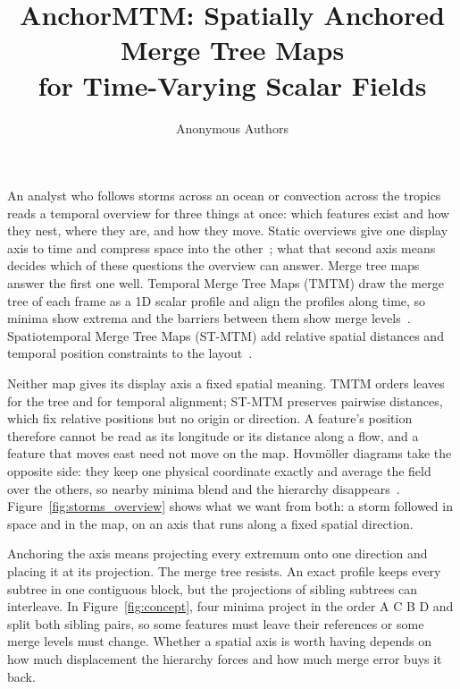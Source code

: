 \documentclass[review]{vgtc}
\title{AnchorMTM: Spatially Anchored Merge Tree Maps\\for Time-Varying Scalar Fields}
\author{Anonymous Authors}
\begin{document}
\maketitle
\raggedbottom
\setlength{\emergencystretch}{1.5em}
An analyst who follows storms across an ocean or convection across the tropics reads a temporal overview for three things at once: which features exist and how they nest, where they are, and how they move. Static overviews give one display axis to time and compress space into the other~\cite{Tversky:2002:Animation,Robertson:2008:Animation,Bach:2017:STC}; what that second axis means decides which of these questions the overview can answer. Merge tree maps answer the first one well. Temporal Merge Tree Maps (TMTM) draw the merge tree of each frame as a 1D scalar profile and align the profiles along time, so minima show extrema and the barriers between them show merge levels~\cite{Koepp:2023:TMTM}. Spatiotemporal Merge Tree Maps (ST-MTM) add relative spatial distances and temporal position constraints to the layout~\cite{STMTM:2026}.

Neither map gives its display axis a fixed spatial meaning. TMTM orders leaves for the tree and for temporal alignment; ST-MTM preserves pairwise distances, which fix relative positions but no origin or direction. A feature's position therefore cannot be read as its longitude or its distance along a flow, and a feature that moves east need not move on the map. Hovm\"oller diagrams take the opposite side: they keep one physical coordinate exactly and average the field over the others, so nearby minima blend and the hierarchy disappears~\cite{Hovmoller:1949}. Figure~\ref{fig:storms_overview} shows what we want from both: a storm followed in space and in the map, on an axis that runs along a fixed spatial direction.

Anchoring the axis means projecting every extremum onto one direction and placing it at its projection. The merge tree resists. An exact profile keeps every subtree in one contiguous block, but the projections of sibling subtrees can interleave. In Figure~\ref{fig:concept}, four minima project in the order A C B D and split both sibling pairs, so some features must leave their references or some merge levels must change. Whether a spatial axis is worth having depends on how much displacement the hierarchy forces and how much merge error buys it back.
\end{document}
